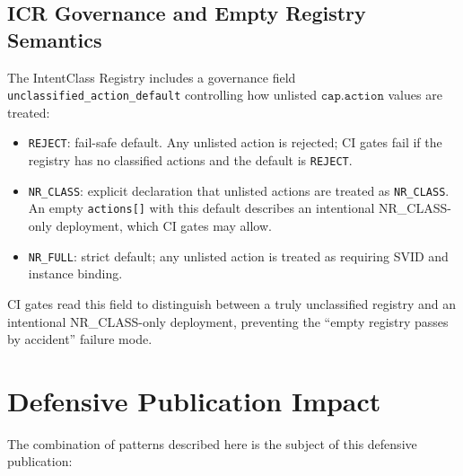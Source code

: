 \documentclass[11pt]{article}
\begin{document}
\subsection{ICR Governance and Empty Registry Semantics}

The IntentClass Registry includes a governance field
\texttt{unclassified\_action\_default} controlling how unlisted
\(\texttt{cap.action}\) values are treated:

\begin{itemize}
  \item \texttt{REJECT}: fail-safe default. Any unlisted action is
        rejected; CI gates fail if the registry has no classified
        actions and the default is \texttt{REJECT}.

  \item \texttt{NR\_CLASS}: explicit declaration that unlisted actions
        are treated as \texttt{NR\_CLASS}. An empty \texttt{actions[]}
        with this default describes an intentional NR\_CLASS-only
        deployment, which CI gates may allow.

  \item \texttt{NR\_FULL}: strict default; any unlisted action is
        treated as requiring SVID and instance binding.
\end{itemize}

CI gates read this field to distinguish between a truly unclassified
registry and an intentional NR\_CLASS-only deployment, preventing
the ``empty registry passes by accident'' failure mode.

\section{Defensive Publication Impact}

The combination of patterns described here is the subject of this
defensive publication:
\end{document}

